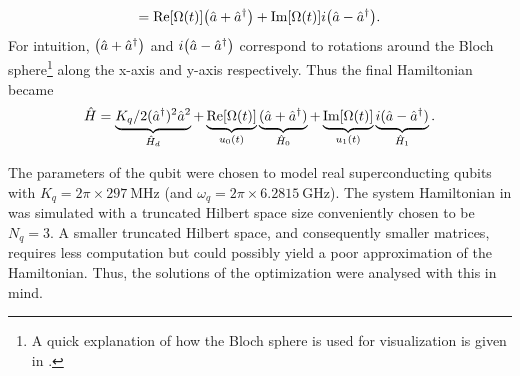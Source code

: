 \documentclass[main.tex]{subfiles}
\begin{document}
\[ = \text{Re}\qty[\Omega(t)]\qty(\hat{a} + \hat{a}^\dagger) + \text{Im}\qty[\Omega(t)]i\qty(\hat{a} - \hat{a}^\dagger). \]
For intuition, \( \qty(\hat{a} + \hat{a}^\dagger) \) and \( i\qty(\hat{a} - \hat{a}^\dagger) \) correspond to rotations around the Bloch sphere\footnote{A quick explanation of how the Bloch sphere is used for visualization is given in .} along the x-axis and y-axis respectively. 
Thus the final Hamiltonian became
\begin{equation}
    \hat{H} = \underbrace{K_q/2(\hat{a}^\dagger)^2\hat{a}^2}_{\hat{H}_d} + \underbrace{\text{Re}\qty[\Omega(t)]}_{u_0(t)}\underbrace{(\hat{a} + \hat{a}^\dagger)}_{\hat{H}_0} + \underbrace{\text{Im}\qty[\Omega(t)]}_{u_1(t)}\underbrace{i(\hat{a} - \hat{a}^\dagger)}_{\hat{H}_1} .
    \label{eq:system-hamiltonian-rotating}
\end{equation}

The parameters of the qubit were chosen to model real superconducting qubits with \( K_q = 2\pi\times\SI{297}{\mega\hertz} \) (and \( \omega_{q} = 2\pi\times\SI{6.2815}{\giga\hertz} \)).
The system Hamiltonian in  was simulated with a truncated Hilbert space size conveniently chosen to be \( N_q = 3 \).
A smaller truncated Hilbert space, and consequently smaller matrices, requires less computation but could possibly yield a poor approximation of the Hamiltonian.
Thus, the solutions of the optimization were analysed with this in mind.
\end{document}
